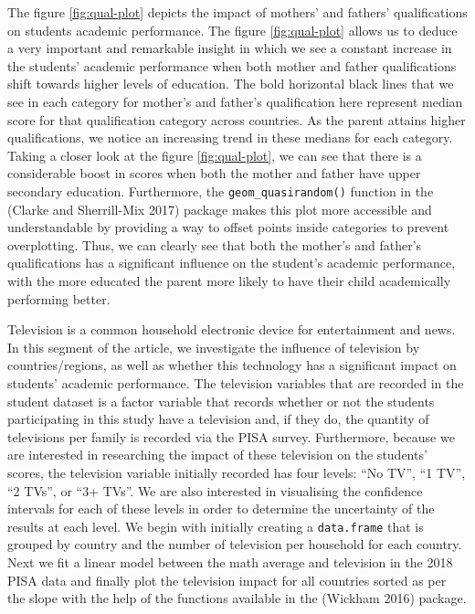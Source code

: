 The figure \ref{fig:qual-plot} depicts the impact of mothers' and fathers' qualifications on students academic performance. The figure \ref{fig:qual-plot} allows us to deduce a very important and remarkable insight in which we see a constant increase in the students' academic performance when both mother and father qualifications shift towards higher levels of education. The bold horizontal black lines that we see in each category for mother's and father's qualification here represent median score for that qualification category across countries. As the parent attains higher qualifications, we notice an increasing trend in these medians for each category. Taking a closer look at the figure \ref{fig:qual-plot}, we can see that there is a considerable boost in scores when both the mother and father have upper secondary education. Furthermore, the \texttt{geom\_quasirandom()} function in the  (Clarke and Sherrill-Mix 2017) package makes this plot more accessible and understandable by providing a way to offset points inside categories to prevent overplotting. Thus, we can clearly see that both the mother's and father's qualifications has a significant influence on the student's academic performance, with the more educated the parent more likely to have their child academically performing better.

Television is a common household electronic device for entertainment and news. In this segment of the article, we investigate the influence of television by countries/regions, as well as whether this technology has a significant impact on students' academic performance. The television variables that are recorded in the student dataset is a factor variable that records whether or not the students participating in this study have a television and, if they do, the quantity of televisions per family is recorded via the PISA survey. Furthermore, because we are interested in researching the impact of these television on the students' scores, the television variable initially recorded has four levels: ``No TV'', ``1 TV'', ``2 TVs'', or ``3+ TVs''. We are also interested in visualising the confidence intervals for each of these levels in order to determine the uncertainty of the results at each level. We begin with initially creating a \texttt{data.frame} that is grouped by country and the number of television per household for each country. Next we fit a linear model between the math average and television in the 2018 PISA data and finally plot the television impact for all countries sorted as per the slope with the help of the functions available in the  (Wickham 2016) package.

